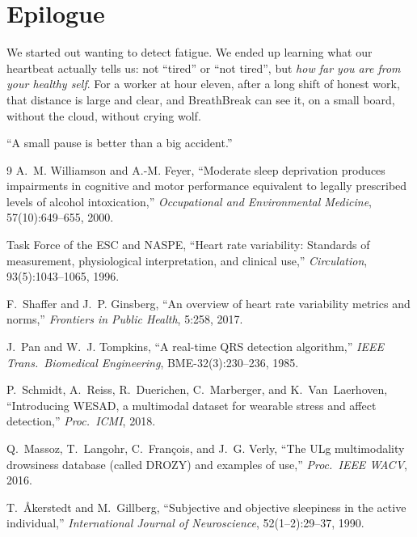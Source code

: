 \documentclass[11pt]{article}
\begin{document}
\section*{\color{bbnavy}Epilogue}

We started out wanting to detect fatigue. We ended up learning what our heartbeat actually tells us: not
``tired'' or ``not tired'', but \emph{how far you are from your healthy self}. For a worker at hour eleven,
after a long shift of honest work, that distance is large and clear, and BreathBreak can see it, on a
small board, without the cloud, without crying wolf.

\begin{center}
\begin{tcolorbox}[enhanced,width=0.8\linewidth,colback=bbnavy,colframe=bbnavy,arc=6pt,halign=center,
  fontupper=\sffamily\Large\itshape\color{white}]
{\color{bbamber}``}A small pause is better than a big accident.{\color{bbamber}''}
\end{tcolorbox}
\end{center}

\begin{thebibliography}{9}
A.~M. Williamson and A.-M. Feyer, ``Moderate sleep deprivation produces impairments in cognitive and motor
performance equivalent to legally prescribed levels of alcohol intoxication,''
\emph{Occupational and Environmental Medicine}, 57(10):649--655, 2000.

Task Force of the ESC and NASPE, ``Heart rate variability: Standards of measurement, physiological
interpretation, and clinical use,'' \emph{Circulation}, 93(5):1043--1065, 1996.

F.~Shaffer and J.~P. Ginsberg, ``An overview of heart rate variability metrics and norms,''
\emph{Frontiers in Public Health}, 5:258, 2017.

J.~Pan and W.~J. Tompkins, ``A real-time QRS detection algorithm,''
\emph{IEEE Trans.\ Biomedical Engineering}, BME-32(3):230--236, 1985.

P.~Schmidt, A.~Reiss, R.~Duerichen, C.~Marberger, and K.~Van~Laerhoven, ``Introducing WESAD, a multimodal
dataset for wearable stress and affect detection,'' \emph{Proc.\ ICMI}, 2018.

Q.~Massoz, T.~Langohr, C.~Fran\c{c}ois, and J.~G. Verly, ``The ULg multimodality drowsiness database
(called DROZY) and examples of use,'' \emph{Proc.\ IEEE WACV}, 2016.

T.~{\AA}kerstedt and M.~Gillberg, ``Subjective and objective sleepiness in the active individual,''
\emph{International Journal of Neuroscience}, 52(1--2):29--37, 1990.
\end{thebibliography}
\end{document}
